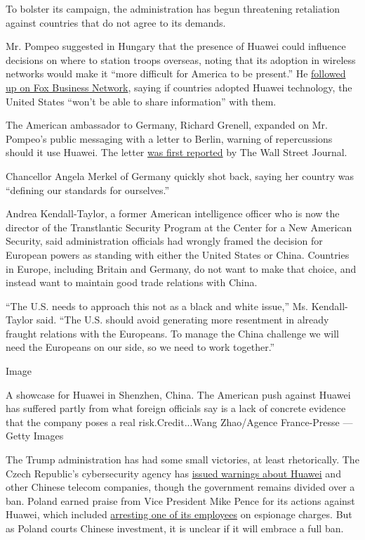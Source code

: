 To bolster its campaign, the administration has begun threatening
retaliation against countries that do not agree to its demands.

Mr. Pompeo suggested in Hungary that the presence of Huawei could
influence decisions on where to station troops overseas, noting that its
adoption in wireless networks would make it ``more difficult for America
to be present.'' He
\href{https://www.foxbusiness.com/technology/pompeo-slams-huawei-us-wont-partner-with-countries-that-use-its-technology}{followed
up on Fox Business Network}, saying if countries adopted Huawei
technology, the United States ``won't be able to share information''
with them.

The American ambassador to Germany, Richard Grenell, expanded on Mr.
Pompeo's public messaging with a letter to Berlin, warning of
repercussions should it use Huawei. The letter
\href{https://www.wsj.com/articles/drop-huawei-or-see-intelligence-sharing-pared-back-u-s-tells-germany-11552314827}{was
first reported} by The Wall Street Journal.

Chancellor Angela Merkel of Germany quickly shot back, saying her
country was ``defining our standards for ourselves.''

Andrea Kendall-Taylor, a former American intelligence officer who is now
the director of the Transtlantic Security Program at the Center for a
New American Security, said administration officials had wrongly framed
the decision for European powers as standing with either the United
States or China. Countries in Europe, including Britain and Germany, do
not want to make that choice, and instead want to maintain good trade
relations with China.

``The U.S. needs to approach this not as a black and white issue,'' Ms.
Kendall-Taylor said. ``The U.S. should avoid generating more resentment
in already fraught relations with the Europeans. To manage the China
challenge we will need the Europeans on our side, so we need to work
together.''

Image

A showcase for Huawei in Shenzhen, China. The American push against
Huawei has suffered partly from what foreign officials say is a lack of
concrete evidence that the company poses a real risk.Credit...Wang
Zhao/Agence France-Presse --- Getty Images

The Trump administration has had some small victories, at least
rhetorically. The Czech Republic's cybersecurity agency has
\href{https://www.nytimes.com/2019/02/12/world/europe/czech-republic-huawei.html}{issued
warnings about Huawei} and other Chinese telecom companies, though the
government remains divided over a ban. Poland earned praise from Vice
President Mike Pence for its actions against Huawei, which included
\href{https://www.nytimes.com/2019/01/11/world/europe/poland-china-huawei-spy.html}{arresting
one of its employees} on espionage charges. But as Poland courts Chinese
investment, it is unclear if it will embrace a full ban.

